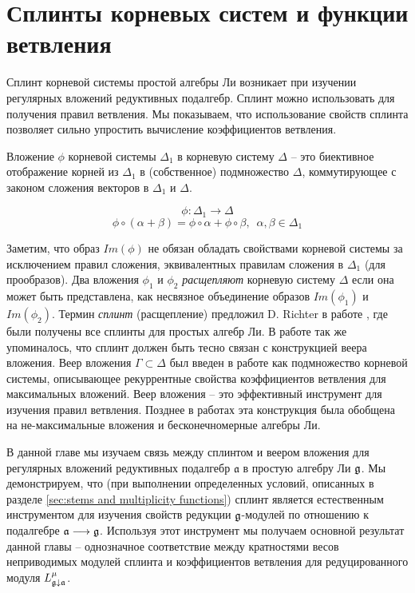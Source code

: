 
\chapter{Сплинты корневых систем и функции ветвления}
\label{cha:splints}


Сплинт корневой системы простой алгебры Ли возникает при изучении регулярных вложений редуктивных подалгебр. Сплинт можно использовать для получения правил ветвления. Мы показываем, что использование свойств сплинта  позволяет сильно упростить вычисление коэффициентов ветвления. 

Вложение  $\phi$ корневой системы $\Delta_1$ в корневую систему $\Delta$ -- это биективное отображение корней из $\Delta_{1}$ в (собственное) подмножество $\Delta$, коммутирующее с законом сложения векторов в $\Delta_{1}$ и $\Delta$.

\begin{equation*}
\phi:\Delta_1 \longrightarrow \Delta
\end{equation*}
\begin{equation*}
\phi \circ (\alpha + \beta) =\phi \circ \alpha + \phi \circ \beta,
\,\,\, \alpha,\beta \in \Delta_1
\end{equation*}

Заметим, что образ  $Im(\phi)$ не обязан обладать свойствами корневой системы за исключением правил сложения, эквивалентных правилам сложения в  $\Delta_{1}$ (для прообразов). Два вложения  $\phi_1$ и $\phi_2$  {\it расщепляют} корневую систему  $\Delta$ если она может быть представлена, как несвязное объединение образов $Im(\phi_1)$ и $Im(\phi_2)$.   
Термин {\it сплинт} (расщепление) предложил D. Richter в работе  \cite{richter2008splints}, где  были получены все сплинты для простых алгебр Ли. В работе так же упоминалось, что сплинт должен быть тесно связан с конструкцией веера вложения. Веер вложения  $\Gamma\subset \Delta$ был введен в работе  \cite{lyakhovsky1996rra} как подмножество корневой системы, описывающее рекуррентные свойства коэффициентов ветвления для максимальных вложений. Веер вложения -- это эффективный инструмент для изучения правил ветвления. Позднее в работах \cite{2010arXiv1007.0318L, ilyin812pbc} эта конструкция была обобщена на не-максимальные вложения и бесконечномерные алгебры Ли.

В данной главе мы изучаем связь между сплинтом и веером вложения для регулярных вложений редуктивных подалгебр ${\mathfrak a}$ в простую алгебру Ли $\mathfrak{g}$. Мы демонстрируем, что (при выполнении определенных условий, описанных в разделе \ref{sec:stems and multiplicity functions}) сплинт является естественным инструментом для изучения свойств редукции  $\mathfrak{g}$-модулей по отношению к подалгебре $\mathfrak{a}\longrightarrow\mathfrak{g}$. Используя этот инструмент мы получаем основной результат данной главы -- однозначное соответствие между кратностями весов неприводимых модулей сплинта и коэффициентов ветвления для редуцированного модуля $L^{\mu}_{\mathfrak{g}\downarrow \mathfrak{a}}$.

